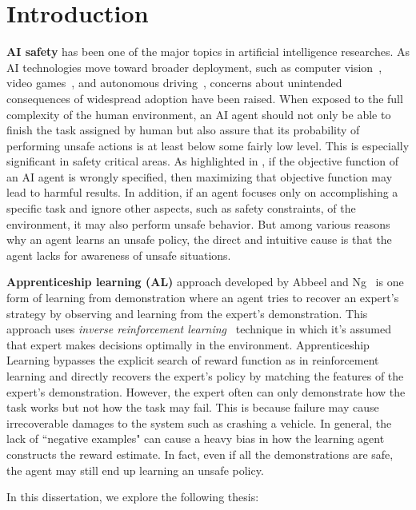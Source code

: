 \chapter{Introduction}
\label{chapter:Introduction}
\thispagestyle{myheadings}
{\bf AI safety} has been one of the major topics in artificial intelligence researches\cite{Bundy:2017:PFA:3086243.3086264}. As AI technologies move toward broader deployment, such as computer vision~\cite{krizhevsky2012imagenet}, video games~\cite{mnih2015human}, and autonomous driving~\cite{levinson2011towards}, concerns about unintended consequences of widespread adoption have been raised. When exposed to the full complexity of the human environment, an AI agent should not only be able to finish the task assigned by human but also assure that its probability of performing unsafe actions is at least below some fairly low level. This is especially significant in safety critical areas. As highlighted in \cite{AmodeiOSCSM16}, if the objective function of an AI agent is wrongly specified, then maximizing that objective function may lead to harmful results. In addition, if an agent focuses only on accomplishing a specific task and ignore other aspects, such as safety constraints, of the environment, it may also perform unsafe behavior. But among various reasons why an agent learns an unsafe policy, the direct and intuitive cause is that the agent lacks for awareness of unsafe situations.  

{\bf Apprenticeship learning (AL)} approach developed by Abbeel and Ng~\cite{Abbeel:2004:ALV:1015330.1015430} is one form of learning from demonstration where an agent tries to recover an expert's strategy by observing and learning from the expert's demonstration. This approach uses {\it inverse reinforcement learning}~\cite{Ng:2000:AIR:645529.657801} technique in which it's assumed that expert makes decisions optimally in the environment. Apprenticeship Learning bypasses the explicit search of reward function as in reinforcement learning and directly recovers the expert's policy by matching the features of the expert's demonstration. However, the expert often can only demonstrate how the task works but not how the task may fail. This is because failure may cause irrecoverable damages to the system such as crashing a vehicle. In general, the lack of ``negative examples" can cause a heavy bias in how the learning agent constructs the reward estimate. In fact, even if all the demonstrations are safe, the agent may still end up learning an unsafe policy.

In this dissertation, we explore the following thesis:

